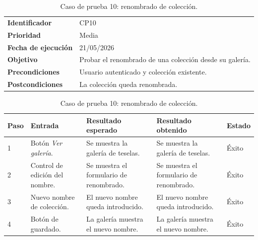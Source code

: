 \begin{table}[]
	\centering
	\footnotesize
	\renewcommand{\arraystretch}{1.2}
	\begin{tabularx}{\textwidth}{p{3.2cm} X}
		\toprule
		\textbf{Identificador} & CP10 \\
		\textbf{Prioridad} & Media \\
		\textbf{Fecha de ejecución} & 21/05/2026 \\
		\textbf{Objetivo} & Probar el renombrado de una colección desde su galería. \\
		\textbf{Precondiciones} & Usuario autenticado y colección existente. \\
		\textbf{Postcondiciones} & La colección queda renombrada. \\
		\midrule
	\end{tabularx}
	\begin{tabularx}{\textwidth}{p{0.8cm} p{3.2cm} X X p{1.3cm}}
		\textbf{Paso} & \textbf{Entrada} & \textbf{Resultado esperado} & \textbf{Resultado obtenido} & \textbf{Estado} \\
		\midrule
		1 & Botón \textit{Ver galería}. & Se muestra la galería de teselas. & Se muestra la galería de teselas. & Éxito \\
		2 & Control de edición del nombre. & Se muestra el formulario de renombrado. & Se muestra el formulario de renombrado. & Éxito \\
		3 & Nuevo nombre de colección. & El nuevo nombre queda introducido. & El nuevo nombre queda introducido. & Éxito \\
		4 & Botón de guardado. & La galería muestra el nuevo nombre. & La galería muestra el nuevo nombre. & Éxito \\
		\bottomrule
	\end{tabularx}
	\caption{Caso de prueba 10: renombrado de colección.}
	\label{tab:cp10}
\end{table}

